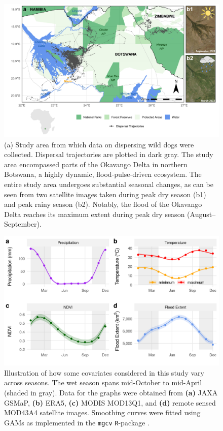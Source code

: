 \documentclass[abstract=on,10pt,a4paper,bibliography=totocnumbered]{article}
\begin{document}
\begin{figure}
 \begin{center}
  \includegraphics[width = \textwidth]{Figures/StudyArea.png} \caption{(a) Study
  area from which data on dispersing wild dogs were collected. Dispersal
  trajectories are plotted in dark gray. The study area encompassed parts of the
  Okavango Delta in northern Botswana, a highly dynamic, flood-pulse-driven
  ecosystem. The entire study area undergoes substantial seasonal changes, as
  can be seen from two satellite images taken during peak dry season (b1) and
  peak rainy season (b2). Notably, the flood of the Okavango Delta reaches its
  maximum extent during peak dry season (August–September).}
  \label{StudyArea}
 \end{center}
\end{figure}

\begin{figure}
\begin{center}
  \includegraphics[width = \textwidth]{Figures/SeasonalCovariates.png}
  \caption{Illustration of how some covariates considered in this study vary
  across seasons. The wet season spans mid-October to mid-April (shaded in
  gray). Data for the graphs were obtained from \textbf{(a)} JAXA GSMaP,
  \textbf{(b)} ERA5, \textbf{(c)} MODIS MOD13Q1, and \textbf{(d)} remote sensed
  MOD43A4 satellite images. Smoothing curves were fitted using GAMs as
  implemented in the \texttt{mgcv} \texttt{R}-package \citep{Wood.2011}.}
  \label{Seasonality}
\end{center}
\end{figure}
\end{document}
